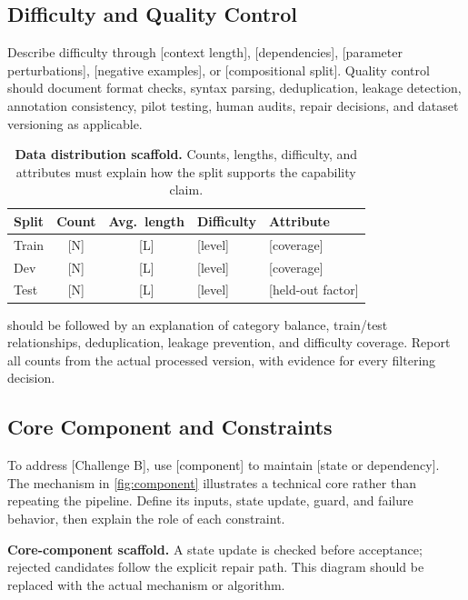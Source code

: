 \subsection{Difficulty and Quality Control}
Describe difficulty through [context length], [dependencies], [parameter perturbations], [negative examples], or [compositional split]. Quality control should document format checks, syntax parsing, deduplication, leakage detection, annotation consistency, pilot testing, human audits, repair decisions, and dataset versioning as applicable.

\begin{table}[htbp]
\centering
\caption{\textbf{Data distribution scaffold.} Counts, lengths, difficulty, and attributes must explain how the split supports the capability claim.}
\label{tab:distribution}
\small
\begin{tabularx}{\linewidth}{@{}lccYY@{}}
\toprule
Split & Count & Avg.\ length & Difficulty & Attribute\\
\midrule
Train & [N] & [L] & [level] & [coverage]\\
Dev & [N] & [L] & [level] & [coverage]\\
Test & [N] & [L] & [level] & [held-out factor]\\
\bottomrule
\end{tabularx}
\end{table}

 should be followed by an explanation of category balance, train/test relationships, deduplication, leakage prevention, and difficulty coverage. Report all counts from the actual processed version, with evidence for every filtering decision.

\subsection{Core Component and Constraints}
To address [Challenge B], use [component] to maintain [state or dependency]. The mechanism in \cref{fig:component} illustrates a technical core rather than repeating the pipeline. Define its inputs, state update, guard, and failure behavior, then explain the role of each constraint.

\begin{widefigure}[htbp]
\centering

\caption{\textbf{Core-component scaffold.} A state update is checked before acceptance; rejected candidates follow the explicit repair path. This diagram should be replaced with the actual mechanism or algorithm.}
\label{fig:component}
\end{widefigure}


